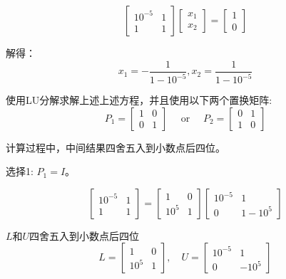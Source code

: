 \begin{example}
    $$ \left[\begin{array}{cc}10^{-5} & 1 \\ 1 & 1\end{array}\right]\left[\begin{array}{l}x_{1} \\ x_{2}\end{array}\right]=\left[\begin{array}{l}1 \\ 0\end{array}\right] $$

    解得： $$ x_{1}=-\frac{1}{1-10^{-5}}, x_{2}=\frac{1}{1-10^{-5}} $$

    使用LU分解求解上述上述方程，并且使用以下两个置换矩阵:
    $$
        P_{1}=\left[\begin{array}{ll}
                1 & 0 \\
                0 & 1
            \end{array}\right] \quad \text { or } \quad P_{2}=\left[\begin{array}{ll}
                0 & 1 \\
                1 & 0
            \end{array}\right]
    $$

    计算过程中，中间结果四舍五入到小数点后四位。

    选择1: $  P_{1}=I $。

    $$
        \left[\begin{array}{cc}
                10^{-5} & 1 \\
                1       & 1
            \end{array}\right]=\left[\begin{array}{cc}
                1      & 0 \\
                10^{5} & 1
            \end{array}\right]\left[\begin{array}{cc}
                10^{-5} & 1        \\
                0       & 1-10^{5}
            \end{array}\right]
    $$

    $L$和$U$四舍五入到小数点后四位
    $$
        L=\left[\begin{array}{cc}
                1      & 0 \\
                10^{5} & 1
            \end{array}\right], \quad U=\left[\begin{array}{cc}
                10^{-5} & 1       \\
                0       & -10^{5}
            \end{array}\right]
    $$


\end{example}
